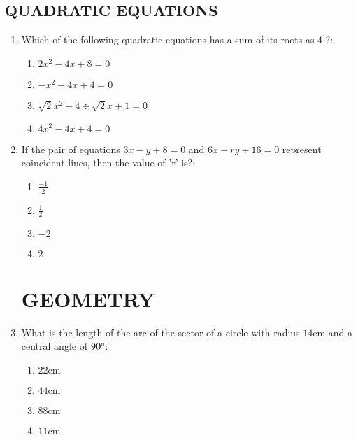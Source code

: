 \documentclass[12pt-letter paper]{article}
\begin{document}
\begin{center}                                  
\section*{QUADRATIC EQUATIONS}        
\end{center}
\begin{enumerate}                                                              
\item Which of the following quadratic equations has a sum of its roots as  $4$ ?:  
\begin{enumerate}
\item $ 2x^2 - 4x + 8 = 0 $                          
\item $ -x^2 - 4x + 4 = 0 $                          
\item $ \sqrt{2}x^2 - 4 \div \sqrt{2}x + 1 = 0 $
\item $ 4x^2 - 4x + 4 = 0 $
\end{enumerate}
\item If the pair of equations $3x - y + 8 = 0$ and $6x - ry + 16 = 0$ represent coincident lines, then the value of 'r' is?:                          \begin{enumerate}        
\item $ \frac{-1}{2} $                        
\item $ \frac{1}{2} $                        
\item $ -2 $      
\item $ 2 $
\end{enumerate}                                    
\begin{center}  
\section*{GEOMETRY}        
\end{center}
\item What is the length of the arc of the sector of a circle with radius $14\mathrm{cm}$ and a central angle of $90\degree$:    
\begin{enumerate}
\item  $ 22\mathrm{cm} $                                                        
\item  $ 44\mathrm{cm} $
\item  $ 88\mathrm{cm}$                                            
\item  $ 11\mathrm{cm}$
\end{enumerate}                                    
\begin{center}                                    

\end{center}
\end{enumerate}
\end{document}
